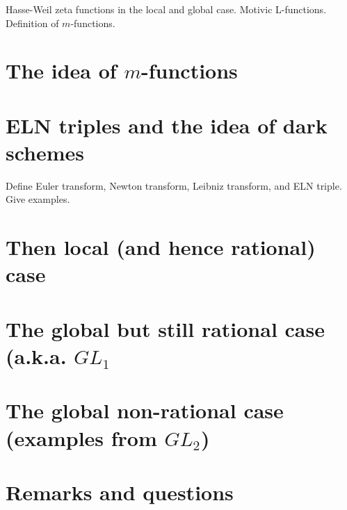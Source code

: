 \documentclass[paper=a4, fontsize=11pt]{scrartcl} %
\numberwithin{equation}{section} %
\numberwithin{figure}{section} %
\numberwithin{table}{section} %
\begin{document}
Hasse-Weil zeta functions in the local and global case. Motivic L-functions. Definition of $m$-functions.


\section{The idea of $m$-functions}




\section{ELN triples and the idea of dark schemes}

Define Euler transform, Newton transform, Leibniz transform, and ELN triple. Give examples.


\section{Then local (and hence rational) case}


\section{The global but still rational case (a.k.a. $GL_1$}


\section{The global non-rational case (examples from $GL_2$)}



\section{Remarks and questions}



\end{document}
